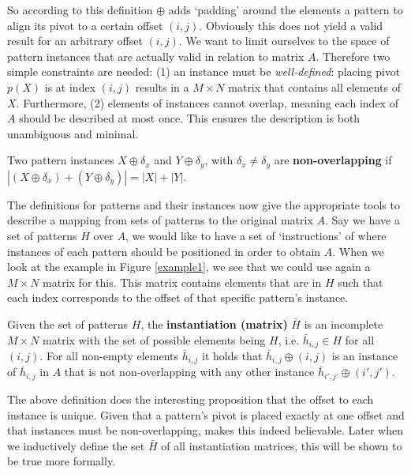 \documentclass{llncs}
\begin{document}
So according to this definition $\oplus$ adds `padding' around the elements a pattern to align its pivot to a certain offset $(i,j)$. Obviously this does not yield a valid result for an arbitrary offset $(i,j)$. We want to limit ourselves to the space of pattern instances that are actually valid in relation to matrix $A$. Therefore two simple constraints are needed: (1) an instance must be \emph{well-defined}: placing pivot $p(X)$ is at index $(i,j)$ results in a $M\times N$ matrix that contains all elements of $X$. Furthermore, (2) elements of instances cannot overlap, meaning each index of $A$ should be described at most once. This ensures the description is both unambiguous and minimal.

\begin{definition}
Two pattern instances $X \oplus \delta_x$ and $Y \oplus \delta_y$, with $\delta_x \neq \delta_y$ are \textbf{non-overlapping} if $|(X \oplus \delta_x) + (Y \oplus \delta_y)| = |X|+|Y|$.
\end{definition}

The definitions for patterns and their instances now give the appropriate tools to describe a mapping from sets of patterns to the original matrix $A$. Say we have a set of patterns $H$ over $A$, we would like to have a set of `instructions' of where instances of each pattern should be positioned in order to obtain $A$. When we look at the example in Figure \ref{example1}, we see that we could use again a $M\times N$ matrix for this. This matrix contains elements that are in $H$ such that each index corresponds to the offset of that specific pattern's instance.

\begin{definition}
Given the set of patterns $H$, the \textbf{instantiation (matrix)} $\bar{H}$ is an incomplete $M\times N$ matrix with the set of possible elements being $H$, i.e. $\bar{h}_{i,j} \in H$ for all $(i,j)$. For all non-empty elements $\bar{h}_{i,j}$ it holds that $\bar{h}_{i,j} \oplus (i,j)$ is an instance of $\bar{h}_{i,j}$ in $A$ that is not non-overlapping with any other instance $\bar{h}_{i',j'} \oplus (i',j')$.
\end{definition}

The above definition does the interesting proposition that the offset to each instance is unique. Given that a pattern's pivot is placed exactly at one offset and that instances must be non-overlapping, makes this indeed believable. Later when we inductively define the set $\bar{H}$ of all instantiation matrices, this will be shown to be true more formally. 
\end{document}
